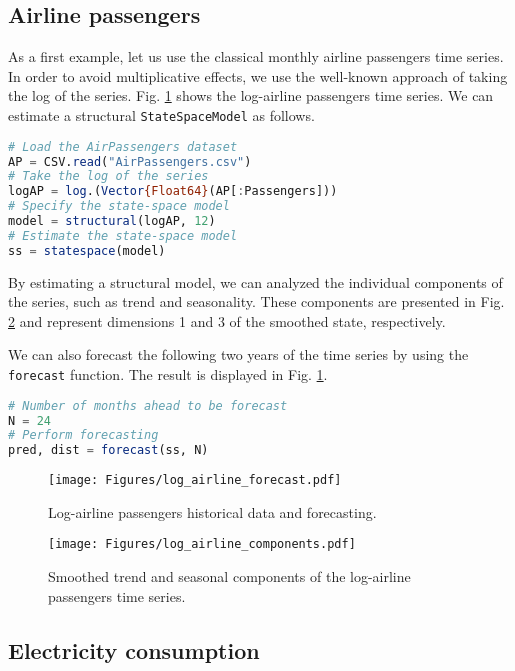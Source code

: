 \documentclass{juliacon}
\begin{document}
\subsection{Airline passengers}

As a first example, let us use the classical monthly airline passengers time series. In order to avoid multiplicative effects, we use the well-known approach of taking the log of the series. Fig. \ref{fig:log_airline_forecast} shows the log-airline passengers time series. We can estimate a structural \texttt{StateSpaceModel} as follows.
%
\begin{lstlisting}[language = Julia]
# Load the AirPassengers dataset
AP = CSV.read("AirPassengers.csv")
# Take the log of the series
logAP = log.(Vector{Float64}(AP[:Passengers]))
# Specify the state-space model
model = structural(logAP, 12)
# Estimate the state-space model
ss = statespace(model)
\end{lstlisting}

By estimating a structural model, we can analyzed the individual components of the series, such as trend and seasonality. These components are presented in Fig. \ref{fig:log_airline_components} and represent dimensions 1 and 3 of the smoothed state, respectively.

We can also forecast the following two years of the time series by using the \texttt{forecast} function. The result is displayed in Fig. \ref{fig:log_airline_forecast}.
%
\begin{lstlisting}[language = Julia]
# Number of months ahead to be forecast
N = 24
# Perform forecasting
pred, dist = forecast(ss, N)
\end{lstlisting}
%
\begin{figure}[h]
	\centering
	\texttt{[image: Figures/log\_airline\_forecast.pdf]}
	\caption{Log-airline passengers historical data and forecasting.}
	\label{fig:log_airline_forecast}
\end{figure}
%
\begin{figure}[h]
	\centering
	\texttt{[image: Figures/log\_airline\_components.pdf]}
	\caption{Smoothed trend and seasonal components of the log-airline passengers time series.}
	\label{fig:log_airline_components}
\end{figure}

\subsection{Electricity consumption}
\end{document}

